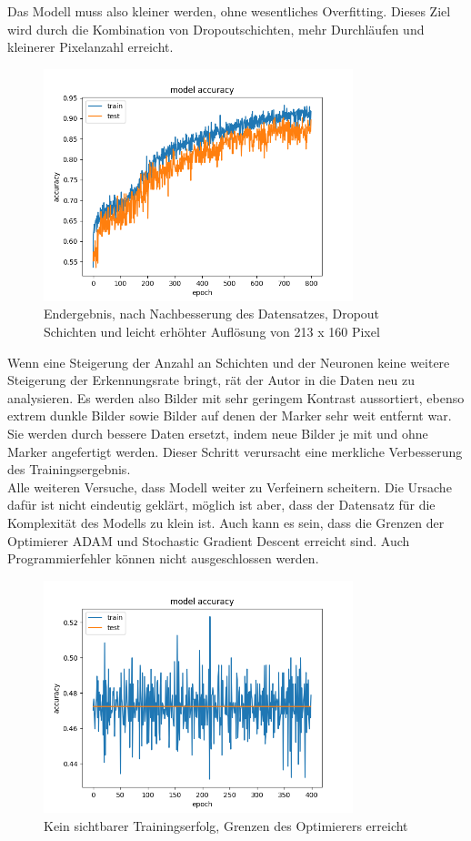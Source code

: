 \documentclass[conference]{IEEEtran}
\begin{document}
	Das Modell muss also kleiner werden, ohne wesentliches Overfitting. 
	Dieses Ziel wird durch die Kombination von Dropoutschichten, mehr 
	Durchläufen und kleinerer Pixelanzahl erreicht. \\
		\begin{figure}[!t]
		\centering
		\includegraphics[width=9cm]{img/213x160:800@32:0_accuracy.png}
		\caption{Endergebnis, nach Nachbesserung des Datensatzes, Dropout 
		Schichten und leicht erhöhter Auflösung von 213 x 160 Pixel}
		\label{end Ergenisse }
	\end{figure}
	 Wenn eine Steigerung der Anzahl an Schichten und der Neuronen keine 
	 weitere Steigerung der Erkennungsrate bringt, rät der Autor in 
	 \cite{moolayil2019learn} die Daten neu zu analysieren. Es werden also 
	 Bilder mit sehr geringem Kontrast aussortiert, ebenso extrem dunkle Bilder 
	 sowie Bilder auf denen der Marker sehr weit entfernt war. Sie werden 
	 durch bessere Daten ersetzt, indem neue Bilder je mit und ohne Marker angefertigt werden.
	 Dieser Schritt verursacht eine merkliche Verbesserung des Trainingsergebnis.
	\\
		

	Alle weiteren Versuche, dass Modell weiter zu Verfeinern scheitern. Die 
	Ursache dafür ist nicht eindeutig geklärt, möglich ist aber, 
	dass der Datensatz für die Komplexität des Modells zu klein ist. Auch 
	kann es sein, dass die Grenzen der Optimierer ADAM und Stochastic 
	Gradient Descent erreicht sind. Auch Programmierfehler können nicht 
	ausgeschlossen werden. 
	
	\begin{figure}[!h]
		\centering
		\includegraphics[width=9cm]{img/480x360:400@32_accuracy.png}
		\caption{Kein sichtbarer Trainingserfolg, Grenzen des Optimierers 
		erreicht}
		\label{erfolgloos }
	\end{figure}
	
\end{document}
